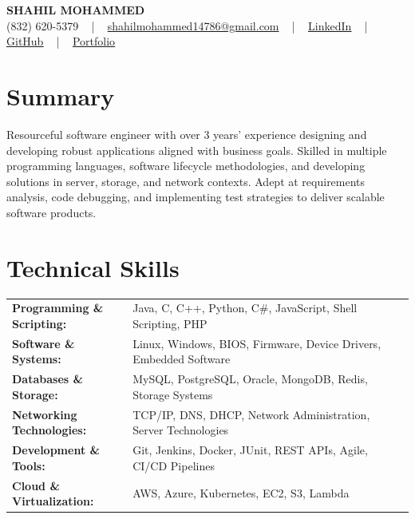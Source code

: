 \documentclass[letterpaper,11pt]{article}
\begin{document}
\begin{center}
    {\fontsize{14pt}{12pt}\selectfont \textbf{\MakeUppercase{Shahil Mohammed}}}\\ \vspace{2pt}
    \fontsize{10pt}{12pt}\selectfont (832) 620-5379 ~ | ~ \href{mailto:shahilmohammed14786@gmail.com}{shahilmohammed14786@gmail.com} ~ | ~  
    \href{https://www.linkedin.com/in/shahil-mohammed-9652931a1/}{\color{blue}\underline{LinkedIn}}  ~ | ~ 
    \href{https://github.com/freakbeast14}{\color{blue}\underline{GitHub}} ~ | ~ 
    \href{https://shahil-mohammed.netlify.app/}{\color{blue}\underline{Portfolio}}
    \vspace{-8pt}
\end{center}

\section{Summary}
\fontsize{9pt}{10pt}\selectfont
Resourceful software engineer with over 3 years’ experience designing and developing robust applications aligned with business goals. Skilled in multiple programming languages, software lifecycle methodologies, and developing solutions in server, storage, and network contexts. Adept at requirements analysis, code debugging, and implementing test strategies to deliver scalable software products.  
 \vspace{-5pt}
 
\section{Technical Skills}
        \vspace{-14pt}
        \begin{table}[h]
            \fontsize{9pt}{10pt}\selectfont
            \begin{tabular}{p{0.3\linewidth} p{0.7\linewidth}}
                \textbf{Programming \& Scripting:} & Java, C, C++, Python, C\#, JavaScript, Shell Scripting, PHP \\
                \textbf{Software \& Systems:} & Linux, Windows, BIOS, Firmware, Device Drivers, Embedded Software \\
                \textbf{Databases \& Storage:} & MySQL, PostgreSQL, Oracle, MongoDB, Redis, Storage Systems \\
                \textbf{Networking Technologies:} & TCP/IP, DNS, DHCP, Network Administration, Server Technologies \\
                \textbf{Development \& Tools:} & Git, Jenkins, Docker, JUnit, REST APIs, Agile, CI/CD Pipelines \\
                \textbf{Cloud \& Virtualization:} & AWS, Azure, Kubernetes, EC2, S3, Lambda \\
            \end{tabular}
        \end{table}
 \vspace{-15pt}
 
\end{document}
